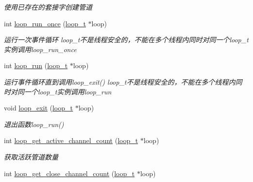 \begin{DoxyCompactItemize}
\begin{DoxyCompactList}\small\item\em 使用已存在的套接字创建管道 \end{DoxyCompactList}\item 
int \hyperlink{a00104_ga2f1994d76e46cf4855ac955ccd41d9ef_ga2f1994d76e46cf4855ac955ccd41d9ef}{loop\+\_\+run\+\_\+once} (\hyperlink{a00050_a9c3ad1cd2de83e09f3a7b59fa82c94ee_a9c3ad1cd2de83e09f3a7b59fa82c94ee}{loop\+\_\+t} $\ast$loop)
\begin{DoxyCompactList}\small\item\em 运行一次事件循环 loop\+\_\+t不是线程安全的，不能在多个线程内同时对同一个loop\+\_\+t实例调用loop\+\_\+run\+\_\+once \end{DoxyCompactList}\item 
int \hyperlink{a00104_ga8eb0f6c8d398c70fc5ca2292664a1187_ga8eb0f6c8d398c70fc5ca2292664a1187}{loop\+\_\+run} (\hyperlink{a00050_a9c3ad1cd2de83e09f3a7b59fa82c94ee_a9c3ad1cd2de83e09f3a7b59fa82c94ee}{loop\+\_\+t} $\ast$loop)
\begin{DoxyCompactList}\small\item\em 运行事件循环直到调用loop\+\_\+exit() loop\+\_\+t不是线程安全的，不能在多个线程内同时对同一个loop\+\_\+t实例调用loop\+\_\+run \end{DoxyCompactList}\item 
void \hyperlink{a00104_ga898c7e8ef4ff2f360a32454b2b1013de_ga898c7e8ef4ff2f360a32454b2b1013de}{loop\+\_\+exit} (\hyperlink{a00050_a9c3ad1cd2de83e09f3a7b59fa82c94ee_a9c3ad1cd2de83e09f3a7b59fa82c94ee}{loop\+\_\+t} $\ast$loop)
\begin{DoxyCompactList}\small\item\em 退出函数loop\+\_\+run() \end{DoxyCompactList}\item 
int \hyperlink{a00104_ga6fa8f99fdc7a036fea6ca91971885e52_ga6fa8f99fdc7a036fea6ca91971885e52}{loop\+\_\+get\+\_\+active\+\_\+channel\+\_\+count} (\hyperlink{a00050_a9c3ad1cd2de83e09f3a7b59fa82c94ee_a9c3ad1cd2de83e09f3a7b59fa82c94ee}{loop\+\_\+t} $\ast$loop)
\begin{DoxyCompactList}\small\item\em 获取活跃管道数量 \end{DoxyCompactList}\item 
int \hyperlink{a00104_ga604184ddcd3e06bc7bfd4f1722778029_ga604184ddcd3e06bc7bfd4f1722778029}{loop\+\_\+get\+\_\+close\+\_\+channel\+\_\+count} (\hyperlink{a00050_a9c3ad1cd2de83e09f3a7b59fa82c94ee_a9c3ad1cd2de83e09f3a7b59fa82c94ee}{loop\+\_\+t} $\ast$loop)

\end{DoxyCompactItemize}
